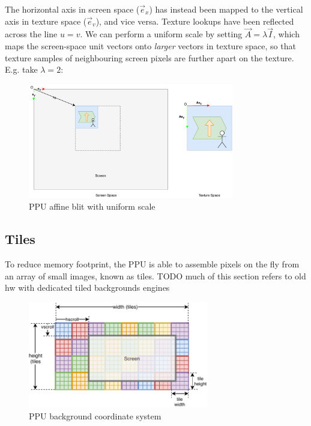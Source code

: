 The horizontal axis in screen space ($\vec{e}_x$) has instead been mapped to the vertical axis in texture space ($\vec{e}_v$), and vice versa. Texture lookups have been reflected across the line $u=v$. We can perform a uniform scale by setting $\vec{A} = \lambda \vec{I}$, which maps the screen-space unit vectors onto {\it larger} vectors in texture space, so that texture samples of neighbouring screen pixels are further apart on the texture. E.g. take $\lambda=2$:


\begin{figure}[H]
\centering
\caption{PPU affine blit with uniform scale}
\label{diagram:ppu_texture_ablit03}
\includegraphics[width=0.8\textwidth]{diagrams/ppu_texture_ablit03.pdf}
\end{figure}


\subsection{Tiles}
\label{section:tiles}

To reduce memory footprint, the PPU is able to assemble pixels on the fly from an array of small images, known as tiles. TODO much of this section refers to old hw with dedicated tiled backgrounds engines

\begin{figure}[H]
\centering
\caption{PPU background coordinate system}
\label{diagram:ppu_bg_coords}
\includegraphics[width=0.7\textwidth]{diagrams/ppu_bg_coords.pdf}
\end{figure}

